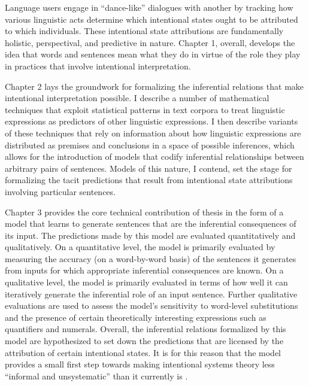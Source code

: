 Language users engage in ``dance-like'' dialogues with another by tracking how various linguistic acts determine which intentional states ought to be attributed to which individuals. These intentional state attributions are fundamentally holistic, perspectival, and predictive in nature. Chapter 1, overall, develops the idea that words and sentences mean what they do in virtue of the role they play in practices that involve intentional interpretation.

Chapter 2 lays the groundwork for formalizing the inferential relations that make intentional interpretation possible. I describe a number of mathematical techniques that exploit statistical patterns in text corpora to treat linguistic expressions as predictors of other linguistic expressions. I then describe variants of these techniques that rely on information about how linguistic expressions are distributed as premises and conclusions in a space of possible inferences, which allows for the introduction of models that codify inferential relationships between arbitrary pairs of sentences. Models of this nature, I contend, set the stage for formalizing the tacit predictions that result from intentional state attributions involving particular sentences. 

Chapter 3 provides the core technical contribution of thesis in the form of a model that learns to generate sentences that are the inferential consequences of its input. The predictions made by this model are evaluated quantitatively and qualitatively. On a quantitative level, the model is primarily evaluated by measuring the accuracy (on a word-by-word basis) of the sentences it generates from inputs for which appropriate inferential consequences are known. On a qualitative level, the model is primarily evaluated in terms of how well it can iteratively generate the inferential role of an input sentence. Further qualitative evaluations are used to assess the model's sensitivity to word-level substitutions and the presence of certain theoretically interesting expressions such as quantifiers and numerals. Overall, the inferential relations formalized by this model are hypothesized to set down the predictions that are licensed by the attribution of certain intentional states. It is for this reason that the model provides a small first step towards making intentional systems theory less ``informal and unsystematic'' than it currently is \citep[][p. 67]{Dennett:1987}.

